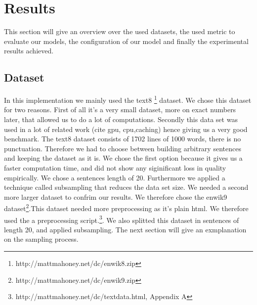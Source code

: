
\chapter{Results}\label{chap:results}



This section will give an overview over the used datasets, the used metric to evaluate our models, the configuration of our model and finally the experimental results achieved.

\section{Dataset}\label{sec:dataset}
In this implementation we mainly used the text8 \footnote{http://mattmahoney.net/dc/enwik8.zip} dataset. We chose this dataset for two reasons. First of all it's a very small dataset, more on exact numbers later, that allowed us to do a lot of computations. Secondly this data set was used in a lot of related work (cite gpu, cpu,caching) hence giving us a very good benchmark. The text8 dataset consists of 1702 lines of 1000 words, there is no punctuation. Therefore we had to choose between building arbitrary sentences and keeping the dataset as it is. We chose the first option because it gives us a faster computation time, and did not show any siginificant loss in quality empirically. We chose a sentences length of 20. Furthermore we applied a technique called subsampling that reduces the data set size. 
We needed a second more larger dataset to confrim our results.  We therefore chose the enwik9 dataset\footnote{http://mattmahoney.net/dc/enwik9.zip}.This dataset needed more preprocessing as it's plain html. We therefore used the a preprocessing script.\footnote{http://mattmahoney.net/dc/textdata.html, Appendix A}. We also splitted this dataset in sentences of length 20, and applied subsampling. The next section will give an exmplanation on the sampling process.
 
 
